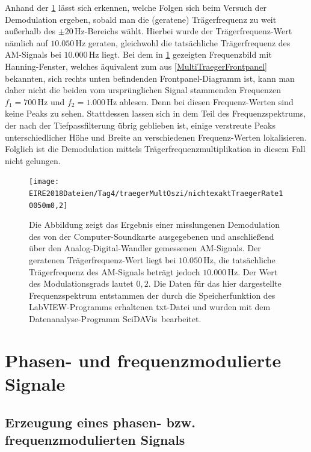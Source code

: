 \documentclass[
a4paper,
12pt,
pagesize,
ngerman
]{scrartcl}
\begin{document}
	Anhand der \cref{AMDemodfailm02} lässt sich erkennen, welche Folgen sich beim Versuch der Demodulation ergeben, sobald man die (geratene) Trägerfrequenz zu weit außerhalb des $\pm 20\,$Hz-Bereichs wählt.
	Hierbei wurde der Trägerfrequenz-Wert nämlich auf $10.050\,$Hz geraten, gleichwohl die tatsächliche Trägerfrequenz des AM-Signals bei $10.000\,$Hz liegt.
	Bei dem in \cref{AMDemodfailm02} gezeigten Frequenzbild mit Hanning-Fenster, welches äquivalent zum aus \cref{MultiTraegerFrontpanel} bekannten, sich rechts unten befindenden Frontpanel-Diagramm ist, kann man daher nicht die beiden vom ursprünglichen Signal stammenden Frequenzen $f_1 = 700\,$Hz und $f_2 = 1.000\,$Hz ablesen.
	Denn bei diesen Frequenz-Werten sind keine Peaks zu sehen.
	Stattdessen lassen sich in dem Teil des Frequenzspektrums, der nach der Tiefpassfilterung übrig geblieben ist, einige verstreute Peaks unterschiedlicher Höhe und Breite an verschiedenen Frequenz-Werten lokalisieren.
	Folglich ist die Demodulation mittels Trägerfrequenzmultiplikation in diesem Fall nicht gelungen.
	
	\begin{figure}[H]
		\centering
		\texttt{[image: EIRE2018Dateien/Tag4/traegerMultOszi/nichtexaktTraegerRate10050m0,2]}
		\caption{Die Abbildung zeigt das Ergebnis einer misslungenen Demodulation des von der Computer-Soundkarte ausgegebenen und anschließend über den Analog-Digital-Wandler gemessenen AM-Signals. Der geratenen Trägerfrequenz-Wert liegt bei $10.050\,$Hz, die tatsächliche Trägerfrequenz des AM-Signals beträgt jedoch $10.000\,$Hz. Der Wert des Modulationsgrads lautet $0,2$. Die Daten für das hier dargestellte Frequenzspektrum entstammen der durch die Speicherfunktion des LabVIEW-Programms erhaltenen txt-Datei und wurden mit dem Datenanalyse-Programm \glqq SciDAVis\grqq\ bearbeitet.}
		\label{AMDemodfailm02}
	\end{figure}
	
	\newpage
	
	
	\section{Phasen- und frequenzmodulierte Signale}

	\subsection{Erzeugung eines phasen- bzw. frequenzmodulierten Signals} \label{FMPMErzeugung} %
	
\end{document}
